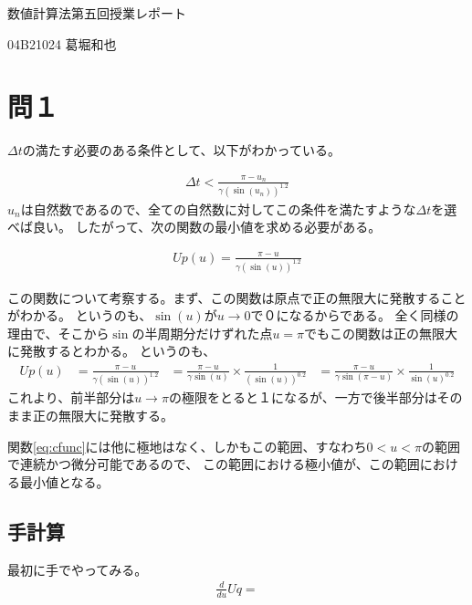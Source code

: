 \documentclass{ltjsarticle}
\begin{document}
\Huge
    \begin{center}
    数値計算法第五回授業レポート

    04B21024
    葛堀和也
    \end{center}
\clearpage

\normalsize

\section{問１}
$\Delta t$の満たす必要のある条件として、以下がわかっている。

\begin{align}
    \Delta t < \frac{\pi - u_{n}}{\gamma (\sin(u_{n}))^{1.2}}
    \label{eq:base}
\end{align}
$u_{n}$は自然数であるので、全ての自然数に対してこの条件を満たすような$\Delta t$を選べば良い。
したがって、次の関数の最小値を求める必要がある。

\begin{align}
    Up(u) = \frac{\pi - u}{\gamma (\sin(u))^{1.2}}
    \label{eq:cfunc}
\end{align}


この関数について考察する。まず、この関数は原点で正の無限大に発散することがわかる。
というのも、$\sin(u)$が$u \rightarrow 0$で０になるからである。
全く同様の理由で、そこから$\sin$の半周期分だけずれた点$u=\pi$でもこの関数は正の無限大に発散するとわかる。
というのも、
\begin{align}
    Up(u) &= \frac{\pi - u}{\gamma (\sin(u))^{1.2}}
          &= \frac{\pi - u}{\gamma \sin(u)}  \times \frac{1}{(\sin(u))^{0.2}}
          &= \frac{\pi - u}{\gamma \sin(\pi -u)} \times \frac{1}{\sin(u)^{0.2}}
\end{align}
これより、前半部分は$u \rightarrow \pi$の極限をとると１になるが、一方で後半部分はそのまま正の無限大に発散する。

関数\ref{eq:cfunc}には他に極地はなく、しかもこの範囲、すなわち$0<u<\pi$の範囲で連続かつ微分可能であるので、
この範囲における極小値が、この範囲における最小値となる。

\subsection{手計算}
最初に手でやってみる。
\begin{align}
    \frac{d}{du}Uq = 
\end{align}
\end{document}
